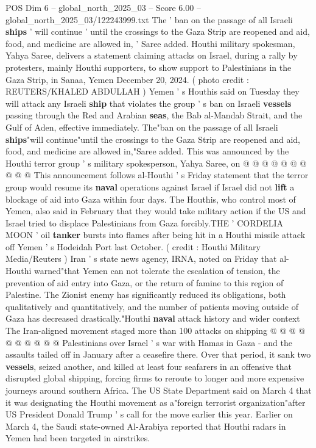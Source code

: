 \begin{textsample}{POS Dim 6 – global\_north\_2025\_03 – Score 6.00 – global\_north\_2025\_03/122243999.txt}  \label{ex:f6_pos_224}
The ' ban on the passage of all Israeli \textbf{ships} ' will continue ' until the crossings to the Gaza Strip are reopened and aid, food, and medicine are allowed in, ' Saree added.
Houthi military spokesman, Yahya Saree, delivers a statement claiming attacks on Israel, during a rally by protesters, mainly Houthi supporters, to show support to Palestinians in the Gaza Strip, in Sanaa, Yemen December 20, 2024. ( photo credit : REUTERS/KHALED ABDULLAH ) Yemen ' s Houthis said on Tuesday they will attack any Israeli \textbf{ship} that violates the group ' s ban on Israeli \textbf{vessels} passing through the Red and Arabian \textbf{seas}, the Bab al-Mandab Strait, and the Gulf of Aden, effective immediately.
The"ban on the passage of all Israeli \textbf{ships}"will continue"until the crossings to the Gaza Strip are reopened and aid, food, and medicine are allowed in,"Saree added.
This was announced by the Houthi terror group ' s military spokesperson, Yahya Saree, on @ @ @ @ @ @ @ @ @ @ This announcement follows al-Houthi ' s Friday statement that the terror group would resume its \textbf{naval} operations against Israel if Israel did not \textbf{lift} a blockage of aid into Gaza within four days.
The Houthis, who control most of Yemen, also said in February that they would take military action if the US and Israel tried to displace Palestinians from Gaza forcibly.THE ' CORDELIA MOON ' oil \textbf{tanker} bursts into flames after being hit in a Houthi missile attack off Yemen ' s Hodeidah Port last October. ( credit : Houthi Military Media/Reuters ) Iran ' s state news agency, IRNA, noted on Friday that al-Houthi warned"that Yemen can not tolerate the escalation of tension, the prevention of aid entry into Gaza, or the return of famine to this region of Palestine.
The Zionist enemy has significantly reduced its obligations, both qualitatively and quantitatively, and the number of patients moving outside of Gaza has decreased drastically."Houthi \textbf{naval} attack history and wider context The Iran-aligned movement staged more than 100 attacks on shipping @ @ @ @ @ @ @ @ @ @ Palestinians over Israel ' s war with Hamas in Gaza - and the assaults tailed off in January after a ceasefire there.
Over that period, it sank two \textbf{vessels}, seized another, and killed at least four seafarers in an offensive that disrupted global shipping, forcing firms to reroute to longer and more expensive journeys around southern Africa.
The US State Department said on March 4 that it was designating the Houthi movement as a"foreign terrorist organization"after US President Donald Trump ' s call for the move earlier this year.
Earlier on March 4, the Saudi state-owned Al-Arabiya reported that Houthi radars in Yemen had been targeted in airstrikes.

\end{textsample}
